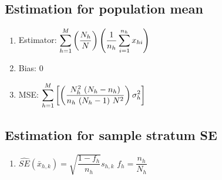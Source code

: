 \subsection{Estimation for population mean}
\begin{enumerate}[itemsep=0.3cm]
    \item Estimator: $
        \displaystyle\sum_{h=1}^{M}
        \left(\dfrac{N_h}{N}\right)
        \left(\dfrac{1}{n_h} \displaystyle\sum_{i=1}^{n_h} x_{hi}\right)
    $
    \hfill \cite{statistics/book/Statistics-for-Data-Scientists/Maurits-Kaptein}
    
    \item Bias: $0$
    \hfill \cite{statistics/book/Statistics-for-Data-Scientists/Maurits-Kaptein}

    \item MSE: $
        \displaystyle\sum_{h=1}^{M}
        \left[
            \left(
                \dfrac{
                    N_h^2\ (N_h - n_h)
                }{
                    n_h\ (N_h-1)\ N^2
                }
            \right) \sigma_h^2
        \right]
    $
    \hfill \cite{statistics/book/Statistics-for-Data-Scientists/Maurits-Kaptein}
\end{enumerate}



\subsection{Estimation for sample stratum SE}
\begin{enumerate}[itemsep=0.3cm]
    \item $
        \hat{SE}(\bar{x}_{h,k})
        = \sqrt{\dfrac{1 - f_h}{n_h}} s_{h,k}
    $
    \hfill
    $f_h = \dfrac{n_h}{N_h}$
    \hfill \cite{statistics/book/Statistics-for-Data-Scientists/Maurits-Kaptein}
\end{enumerate}




